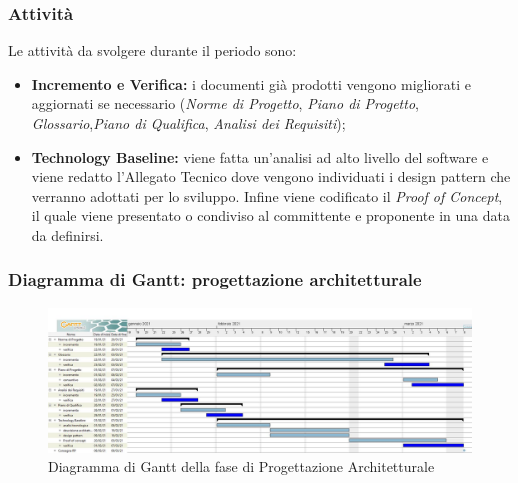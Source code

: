 \subsubsection{Attività}
Le attività da svolgere durante il periodo sono:
\begin{itemize}
	\item \textbf{Incremento e Verifica:} i documenti già prodotti vengono migliorati e aggiornati se necessario (\textit{Norme di Progetto}, \textit{Piano di Progetto}, \textit{Glossario},\textit{Piano di Qualifica}, \textit{Analisi dei Requisiti});
	\item \textbf{Technology Baseline:} viene fatta un'analisi ad alto livello del software e viene redatto l'Allegato Tecnico dove vengono individuati i design pattern che verranno adottati per lo sviluppo. Infine viene codificato il \textit{Proof of Concept}, il quale viene presentato o condiviso al committente e proponente in una data da definirsi.
\end{itemize}
\subsubsection{Diagramma di Gantt: progettazione architetturale}
\begin{figure}[H]
    \centering
    \includegraphics[scale = 0.25]{components/img/progettazione_architetturale.jpg}
    \caption{Diagramma di Gantt della fase di Progettazione Architetturale}
    \label{fig:Diagramma di Gantt, fase di Progettazione Architetturale}
\end{figure}

\newpage
